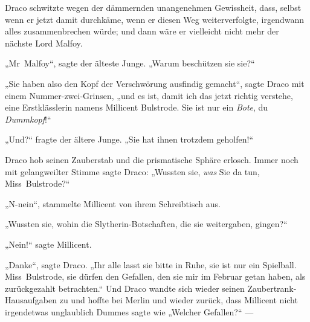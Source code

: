 Draco schwitzte wegen der dämmernden unangenehmen Gewissheit, dass, selbst wenn er jetzt damit durchkäme, wenn er diesen Weg weiterverfolgte, irgendwann alles zusammenbrechen würde; und dann wäre er vielleicht nicht mehr der nächste Lord Malfoy.

„Mr~Malfoy“, sagte der älteste Junge.
„Warum beschützen sie sie?“

„Sie haben also den Kopf der Verschwörung ausfindig gemacht“, sagte Draco mit einem Nummer-zwei-Grinsen, „und es ist, damit ich das jetzt richtig verstehe, eine Erstklässlerin namens Millicent Bulstrode. Sie ist nur ein \emph{Bote}, du \emph{Dummkopf}!“

„Und?“ fragte der ältere Junge.
„Sie hat ihnen trotzdem geholfen!“

Draco hob seinen Zauberstab und die prismatische Sphäre erlosch. Immer noch mit gelangweilter Stimme sagte Draco:
„Wussten sie, \emph{was} Sie da tun, Miss~Bulstrode?“

„N-nein“, stammelte Millicent von ihrem Schreibtisch aus.

„Wussten sie, wohin die Slytherin-Botschaften, die sie weitergaben, gingen?“

„Nein!“ sagte Millicent.

„Danke“, sagte Draco.
„Ihr alle lasst sie bitte in Ruhe, sie ist nur ein Spielball. Miss~Bulstrode, sie dürfen den Gefallen, den sie mir im Februar getan haben, als zurückgezahlt betrachten.“ Und Draco wandte sich wieder seinen Zaubertrank-Hausaufgaben zu und hoffte bei Merlin und wieder zurück, dass Millicent nicht irgendetwas unglaublich Dummes sagte wie
„Welcher Gefallen?“ —

